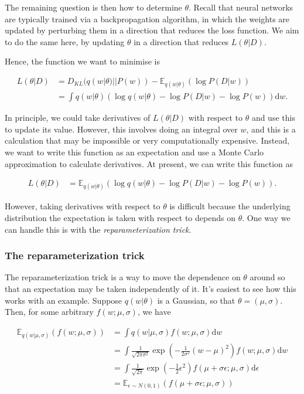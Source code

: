 \documentclass[11pt]{article}
\begin{document}
The remaining question is then how to determine \(\theta\). Recall that
neural networks are typically trained via a backpropagation algorithm,
in which the weights are updated by perturbing them in a direction that
reduces the loss function. We aim to do the same here, by updating
\(\theta\) in a direction that reduces \(L(\theta | D)\).

Hence, the function we want to minimise is

\[
\begin{align}
L(\theta | D) &= D_{KL} ( q(w | \theta) || P(w) ) - \mathbb{E}_{q(w | \theta)}(\log P(D | w)) \\
&= \int q(w | \theta) ( \log q(w | \theta) - \log P(D | w) - \log P(w) ) \text{d}w.
\end{align}
\]

In principle, we could take derivatives of \(L(\theta | D)\) with
respect to \(\theta\) and use this to update its value. However, this
involves doing an integral over \(w\), and this is a calculation that
may be impossible or very computationally expensive. Instead, we want to
write this function as an expectation and use a Monte Carlo
approximation to calculate derivatives. At present, we can write this
function as

\[
\begin{align}
L(\theta | D) &= \mathbb{E}_{q(w | \theta)} ( \log q(w | \theta) - \log P(D | w) - \log P(w) ).
\end{align}
\]

However, taking derivatives with respect to \(\theta\) is difficult
because the underlying distribution the expectation is taken with
respect to depends on \(\theta\). One way we can handle this is with the
\emph{reparameterization trick}.

    \hypertarget{the-reparameterization-trick}{%
\subsubsection{The reparameterization
trick}\label{the-reparameterization-trick}}

The reparameterization trick is a way to move the dependence on
\(\theta\) around so that an expectation may be taken independently of
it. It's easiest to see how this works with an example. Suppose
\(q(w | \theta)\) is a Gaussian, so that \(\theta = (\mu, \sigma)\).
Then, for some arbitrary \(f(w; \mu, \sigma)\), we have

\[
\begin{align}
\mathbb{E}_{q(w | \mu, \sigma)} (f(w; \mu, \sigma) ) &= \int q(w | \mu, \sigma) f(w; \mu, \sigma) \text{d}w \\
&= \int \frac{1}{\sqrt{2 \pi \sigma^2}} \exp \left( -\frac{1}{2 \sigma^2} (w - \mu)^2 \right) f(w; \mu, \sigma) \text{d}w \\
&= \int \frac{1}{\sqrt{2 \pi}} \exp \left( -\frac{1}{2} \epsilon^2 \right) f \left( \mu + \sigma \epsilon; \mu, \sigma \right) \text{d}\epsilon \\
&= \mathbb{E}_{\epsilon \sim N(0, 1)} (f \left( \mu + \sigma \epsilon; \mu, \sigma \right) )
\end{align}
\]
\end{document}
